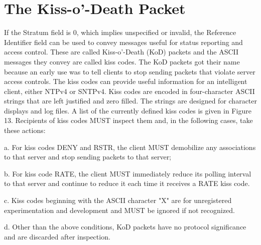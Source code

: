 \section{The Kiss-o’-Death Packet}

If the Stratum field is 0, which implies unspecified or invalid, the
Reference Identifier field can be used to convey messages useful for
status reporting and access control. These are called Kiss-o’-Death
(KoD) packets and the ASCII messages they convey are called kiss
codes. The KoD packets got their name because an early use was to
tell clients to stop sending packets that violate server access
controls. The kiss codes can provide useful information for an
intelligent client, either NTPv4 or SNTPv4. Kiss codes are encoded
in four-character ASCII strings that are left justified and zero
filled. The strings are designed for character displays and log
files. A list of the currently defined kiss codes is given in
Figure 13. Recipients of kiss codes MUST inspect them and, in the
following cases, take these actions:

a. For kiss codes DENY and RSTR, the client MUST demobilize any
associations to that server and stop sending packets to that
server;

b. For kiss code RATE, the client MUST immediately reduce its
polling interval to that server and continue to reduce it each
time it receives a RATE kiss code.

c. Kiss codes beginning with the ASCII character "X" are for
unregistered experimentation and development and MUST be ignored
if not recognized.

d. Other than the above conditions, KoD packets have no protocol
significance and are discarded after inspection.

